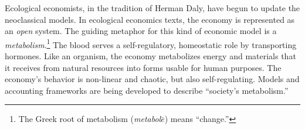 
Ecological economists, 
in the tradition of Herman Daly, 
have begun to update the neoclassical models.\cite{F-K2003} 
In ecological economics texts, 
the economy is 
represented as an \emph{open} system. 
The guiding metaphor for this kind of 
economic model is a \emph{metabolism}.\footnote{The 
	Greek root of metabolism 
	(\emph{metabol$\bar{e}$}) means ``change.''}
The blood serves a self-regulatory, homeostatic role
by transporting hormones. 
Like an organism,
the economy metabolizes energy and materials 
that it receives from natural resources into forms 
usable for human purposes.
The economy's behavior is non-linear and chaotic,
but also self-regulating.
Models and accounting frameworks are being
developed to describe ``society's metabolism.''~\cite{F-K1998, 
ConAccount1998, Giampietro2000, Daniels2001, Ayres2002, 
Haberl2001, Giampietro2013}

